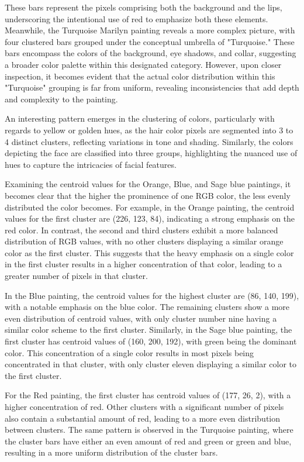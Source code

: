 \documentclass{article}
\begin{document}
These bars represent the pixels comprising both the
background and the lips, underscoring the intentional use of red to
emphasize both these elements. Meanwhile, the Turquoise Marilyn painting
reveals a more complex picture, with four clustered bars grouped under
the conceptual umbrella of "Turquoise." These bars encompass the
colors of the background, eye shadows, and collar, suggesting a broader
color palette within this designated category. However, upon closer
inspection, it becomes evident that the actual color distribution within
this "Turquoise" grouping is far from uniform, revealing
inconsistencies that add depth and complexity to the painting.

An interesting pattern emerges in the clustering of colors, particularly
with regards to yellow or golden hues, as the hair color pixels are
segmented into 3 to 4 distinct clusters, reflecting variations in tone
and shading. Similarly, the colors depicting the face are classified
into three groups, highlighting the nuanced use of hues to capture the
intricacies of facial features.

Examining the centroid values for the Orange, Blue, and Sage blue
paintings, it becomes clear that the higher the prominence of one RGB
color, the less evenly distributed the color becomes. For example, in
the Orange painting, the centroid values for the first cluster are (226,
123, 84), indicating a strong emphasis on the red color. In contrast,
the second and third clusters exhibit a more balanced distribution of
RGB values, with no other clusters displaying a similar orange color as
the first cluster. This suggests that the heavy emphasis on a single
color in the first cluster results in a higher concentration of that
color, leading to a greater number of pixels in that cluster.

In the Blue painting, the centroid values for the highest cluster are
(86, 140, 199), with a notable emphasis on the blue color. The remaining
clusters show a more even distribution of centroid values, with only
cluster number nine having a similar color scheme to the first cluster.
Similarly, in the Sage blue painting, the first cluster has centroid
values of (160, 200, 192), with green being the dominant color. This
concentration of a single color results in most pixels being
concentrated in that cluster, with only cluster eleven displaying a
similar color to the first cluster.

For the Red painting, the first cluster has centroid values of (177, 26,
2), with a higher concentration of red. Other clusters with a
significant number of pixels also contain a substantial amount of red,
leading to a more even distribution between clusters. The same pattern
is observed in the Turquoise painting, where the cluster bars have
either an even amount of red and green or green and blue, resulting in a
more uniform distribution of the cluster bars.
\end{document}
